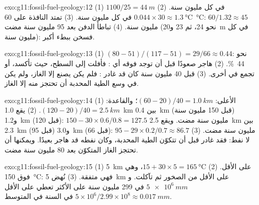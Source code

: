 \begin{solution}{exo:g11:fossil-fuel-geology:12}
(1) $1100/25 = \qty{44}{m}$ في كل مليون سنة. (2) $0.044 \times 30
\approx \qty{1.3}{\degreeCelsius}$ في كل مليون سنة. (3) تمتد النافذة على
\qty{60}{\degreeCelsius}: $60/1.32 \approx 45$ مليون سنة. (4) تباطأ الدفن
بعد 95 مليون سنة مضت (نحو 24، ثم 23
و\qty{20}{m} في كل مليون سنة): فسخن  ببطء أكبر.
\end{solution}

\begin{solution}{exo:g11:fossil-fuel-geology:13}
(1) $(80 - 51)/(117 - 51) = 29/66 \approx 0.44$: نحو \qty{44}{\percent}.
(2) هاجر صعودًا قبل أن توجد فوقه أي : فأفلت إلى
السطح، حيث تأكسد، أو تجمع في  أخرى. (3) قبل 40
مليون سنة كان  قد غادر : فلم يكن يصنع إلا الغاز،
ولم يكن في وسع الطية المحدبة أن تحتجز منه إلا الغاز.
\end{solution}

\begin{solution}{exo:g11:fossil-fuel-geology:14}
(1) الأعلى: $(60 - 20)/40 = \qty{1.0}{km}$؛ والقاعدة: $(120 - 20)/40 =
\qty{2.5}{km}$. (2) يقع \qty{1.0}{km} بين \qty{0.4}{km} (قبل 150 مليون
سنة) و\qty{1.2}{km} (قبل 120): $150 - 30 \times 0.6/0.8 = 127.5$
مليون سنة مضت. ويقع \qty{2.5}{km} بين \qty{2.3}{km} (قبل 95)
و\qty{3.0}{km} (قبل 66): $95 - 29 \times 0.2/0.7 \approx 86.7$ مليون سنة
مضت. (3) لا نفط: فقد غادر   قبل أن تتكوّن الطية
المحدبة، وكان نفطه قد هاجر بعيدًا. ويمكنها أن تحتجز الغاز المتكوّن بعد 80
مليون سنة مضت.
\end{solution}

\begin{solution}{exo:g11:fossil-fuel-geology:15}
(1) \qty{5}{km} على الأقل. (2) $15 + 30 \times 5 = \qty{165}{\degreeCelsius}$،
وهي فوق \qty{150}{\degreeCelsius}: فهي متفقة. (3) نُهض \qty{5}{km} على الأقل
من الصخور ثم تآكلت. و$\qty{5e6}{mm}$ في \num{299} مليون سنة على الأكثر
تعطي على الأقل $5 \times 10^6/2.99 \times 10^8
\approx \qty{0.017}{mm}$ في السنة في المتوسط.
\end{solution}

